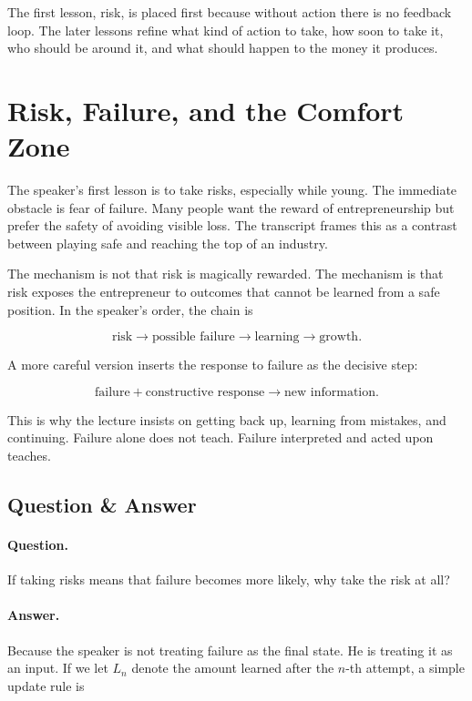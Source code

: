 The first lesson, risk, is placed first because without action there is no feedback loop. The later lessons refine what kind of action to take, how soon to take it, who should be around it, and what should happen to the money it produces.

\section{Risk, Failure, and the Comfort Zone}

The speaker's first lesson is to take risks, especially while young. The immediate obstacle is fear of failure. Many people want the reward of entrepreneurship but prefer the safety of avoiding visible loss. The transcript frames this as a contrast between playing safe and reaching the top of an industry.

The mechanism is not that risk is magically rewarded. The mechanism is that risk exposes the entrepreneur to outcomes that cannot be learned from a safe position. In the speaker's order, the chain is

\begin{equation}
\text{risk} \longrightarrow \text{possible failure} \longrightarrow \text{learning} \longrightarrow \text{growth}.
\end{equation}

A more careful version inserts the response to failure as the decisive step:

\begin{equation}
\text{failure} + \text{constructive response}
\longrightarrow
\text{new information}.
\end{equation}

This is why the lecture insists on getting back up, learning from mistakes, and continuing. Failure alone does not teach. Failure interpreted and acted upon teaches.

\subsection{Question \& Answer}

\paragraph{Question.}
If taking risks means that failure becomes more likely, why take the risk at all?

\paragraph{Answer.}
Because the speaker is not treating failure as the final state. He is treating it as an input. If we let \(L_n\) denote the amount learned after the \(n\)-th attempt, a simple update rule is

